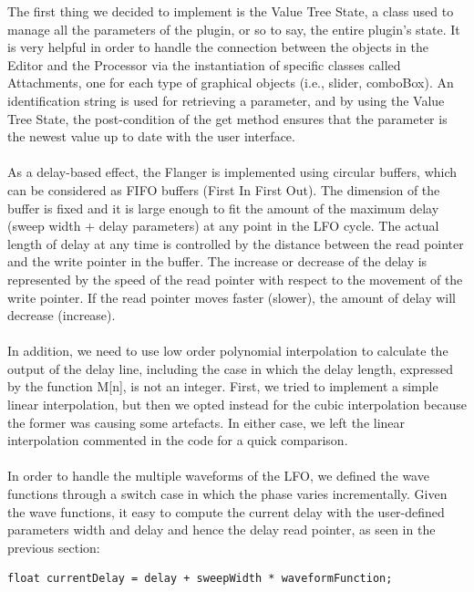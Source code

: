 \documentclass[a4paper,12pt]{report}
\begin{document}
The first thing we decided to implement is the Value Tree State, a class used to manage all the parameters of the plugin, or so to say, the entire plugin’s state. It is very helpful in order to handle the connection between the objects in the Editor and the Processor via the instantiation of specific classes called Attachments, one for each type of graphical objects (i.e., slider, comboBox). An identification string is used for retrieving a parameter, and by using the Value Tree State, the post-condition of the get method ensures that the parameter is the newest value up to date with the user interface. \\ 
\\ As a delay-based effect, the Flanger is implemented using circular buffers, which can be considered as FIFO buffers (First In First Out). The dimension of the buffer is fixed and it is large enough to fit the amount of the maximum delay (sweep width + delay parameters) at any point in the LFO cycle.
The actual length of delay at any time is controlled by the distance between the read pointer and the write pointer in the buffer. The increase or decrease of the delay is represented by the speed of the read pointer with respect to the movement of the write pointer. If the read pointer moves faster (slower), the amount of delay will decrease (increase).\\
\\ In addition, we need to use low order polynomial interpolation to calculate the output of the delay line, including the case in which the delay length, expressed by the function M[n], is not an integer. First, we tried to implement a simple linear interpolation, but then we opted instead for the cubic interpolation because the former was causing some artefacts. In either case, we left the linear interpolation commented in the code for a quick comparison.\\ 
\\ In order to handle the multiple waveforms of the LFO, we defined the wave functions through a switch case in which the phase varies incrementally. Given the wave functions, it easy to compute the current delay with the user-defined parameters width and delay and hence the delay read pointer, as seen in the previous section:
\begin{verbatim}
float currentDelay = delay + sweepWidth * waveformFunction;
\end{verbatim}
\end{document}
